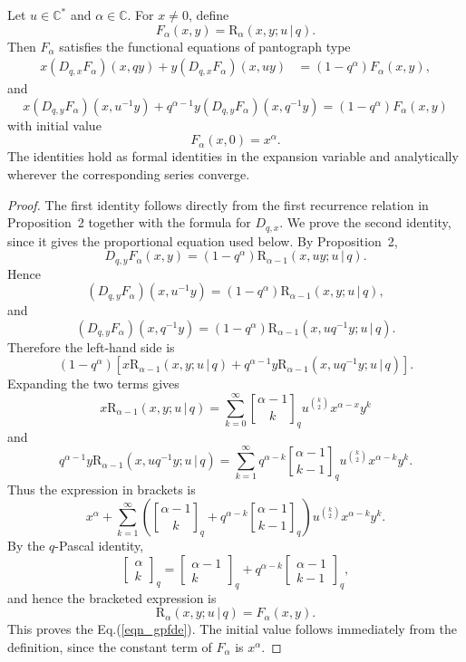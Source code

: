 \documentclass[10pt,a4paper]{amsart}
\newcommand{\qbinom}{\genfrac{[}{]}{0pt}{}}
\newcommand{\rr}{\mathrm{R}}
\begin{document}
\begin{theorem}
Let \(u\in\mathbb C^\ast\) and \(\alpha\in\mathbb C\). For \(x\neq0\), define
\[
F_\alpha(x,y)=\rr_{\alpha}(x,y;u\,|\,q).
\]
Then \(F_\alpha\) satisfies the functional equations of pantograph type
\begin{align}
x(D_{q,x}F_\alpha)(x,qy)
+
y(D_{q,x}F_\alpha)(x,uy)
&=
(1-q^\alpha)F_\alpha(x,y),\label{eqn_gpfde2}
\end{align}
and
\begin{equation}\label{eqn_gpfde}
x(D_{q,y}F_\alpha)(x,u^{-1}y)
+
q^{\alpha-1}y(D_{q,y}F_\alpha)(x,q^{-1}y)
=
(1-q^\alpha)F_\alpha(x,y)    
\end{equation}
with initial value
\[
F_\alpha(x,0)=x^\alpha.
\]
The identities hold as formal identities in the expansion variable and analytically wherever the corresponding series converge.
\end{theorem}

\begin{proof}
The first identity follows directly from the first recurrence relation in Proposition~2 together with the formula for \(D_{q,x}\). We prove the second identity, since it gives the proportional equation used below. By Proposition~2,
\[
D_{q,y}F_\alpha(x,y)
=
(1-q^\alpha)\rr_{\alpha-1}(x,uy;u\,|\,q).
\]
Hence
\[
(D_{q,y}F_\alpha)(x,u^{-1}y)
=
(1-q^\alpha)\rr_{\alpha-1}(x,y;u\,|\,q),
\]
and
\[
(D_{q,y}F_\alpha)(x,q^{-1}y)
=
(1-q^\alpha)\rr_{\alpha-1}(x,uq^{-1}y;u\,|\,q).
\]
Therefore the left-hand side is
\[
(1-q^\alpha)
\left[
x\rr_{\alpha-1}(x,y;u\,|\,q)
+
q^{\alpha-1}y\rr_{\alpha-1}(x,uq^{-1}y;u\,|\,q)
\right].
\]
Expanding the two terms gives
\[
x\rr_{\alpha-1}(x,y;u\,|\,q)
=
\sum_{k=0}^{\infty}\qbinom{\alpha-1}{k}_q
u^{\binom{k}{2}}x^{\alpha-x}y^k
\]
and
\[
q^{\alpha-1}y\rr_{\alpha-1}(x,uq^{-1}y;u\,|\,q)
=
\sum_{k=1}^{\infty}
q^{\alpha-k}\qbinom{\alpha-1}{k-1}_q
u^{\binom{k}{2}}x^{\alpha-k}y^k.
\]
Thus the expression in brackets is
\[
x^\alpha+
\sum_{k=1}^{\infty}
\left(\qbinom{\alpha-1}{k}_q+
q^{\alpha-k}\qbinom{\alpha-1}{k-1}_q
\right)
u^{\binom{k}{2}}x^{\alpha-k}y^k.
\]
By the \(q\)-Pascal identity,
\[
\begin{bmatrix}
\alpha\\ k
\end{bmatrix}_q
=
\begin{bmatrix}
\alpha-1\\ k
\end{bmatrix}_q
+
q^{\alpha-k}
\begin{bmatrix}
\alpha-1\\ k-1
\end{bmatrix}_q,
\]
and hence the bracketed expression is
\[
\rr_{\alpha}(x,y;u\,|\,q)=F_\alpha(x,y).
\]
This proves the Eq.(\ref{eqn_gpfde}). The initial value follows immediately from
the definition, since the constant term of \(F_\alpha\) is \(x^\alpha\).
\end{proof}
\end{document}
